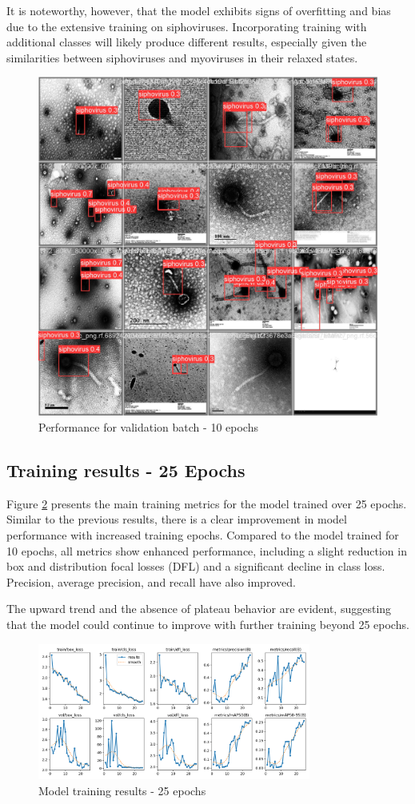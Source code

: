 \documentclass[runningheads]{llncs}
\begin{document}
It is noteworthy, however, that the model exhibits signs of overfitting and bias due to the extensive training on siphoviruses. Incorporating training with additional classes will likely produce different results, especially given the similarities between siphoviruses and myoviruses in their relaxed states.

\begin{figure}[H]
\begin{center}
\includegraphics[width=.4\textwidth]{./figures/fig7_10e_val_batch0_pred.jpg}
\caption{Performance for validation batch - 10 epochs} \label{fig7}
\end{center}
\end{figure}

\subsection{Training results - 25 Epochs}

Figure \ref{fig8} presents the main training metrics for the model trained over 25 epochs. Similar to the previous results, there is a clear improvement in model performance with increased training epochs. Compared to the model trained for 10 epochs, all metrics show enhanced performance, including a slight reduction in box and distribution focal losses (DFL) and a significant decline in class loss. Precision, average precision, and recall have also improved.

The upward trend and the absence of plateau behavior are evident, suggesting that the model could continue to improve with further training beyond 25 epochs.

\begin{figure}[H]
\begin{center}
\includegraphics[width=0.8\textwidth]{./figures/fig8_25e_results.png}
\caption{Model training results - 25 epochs} \label{fig8}
\end{center}
\end{figure}
\end{document}
